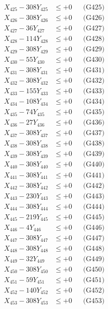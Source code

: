 \documentclass[a4paper,10pt]{article}
\begin{document}
{\begin{align}
X_{425} - 308Y_{425} &\leq +0 && \text{(G425)} \\
X_{426} - 308Y_{426} &\leq +0 && \text{(G426)} \\
X_{427} - 36Y_{427} &\leq +0 && \text{(G427)} \\
X_{428} - 114Y_{428} &\leq +0 && \text{(G428)} \\
X_{429} - 308Y_{429} &\leq +0 && \text{(G429)} \\
X_{430} - 55Y_{430} &\leq +0 && \text{(G430)} \\
\allowbreak
X_{431} - 308Y_{431} &\leq +0 && \text{(G431)} \\
X_{432} - 308Y_{432} &\leq +0 && \text{(G432)} \\
X_{433} - 155Y_{433} &\leq +0 && \text{(G433)} \\
X_{434} - 108Y_{434} &\leq +0 && \text{(G434)} \\
X_{435} - 74Y_{435} &\leq +0 && \text{(G435)} \\
X_{436} - 27Y_{436} &\leq +0 && \text{(G436)} \\
X_{437} - 308Y_{437} &\leq +0 && \text{(G437)} \\
X_{438} - 308Y_{438} &\leq +0 && \text{(G438)} \\
X_{439} - 308Y_{439} &\leq +0 && \text{(G439)} \\
X_{440} - 308Y_{440} &\leq +0 && \text{(G440)} \\
\allowbreak
X_{441} - 308Y_{441} &\leq +0 && \text{(G441)} \\
X_{442} - 308Y_{442} &\leq +0 && \text{(G442)} \\
X_{443} - 230Y_{443} &\leq +0 && \text{(G443)} \\
X_{444} - 308Y_{444} &\leq +0 && \text{(G444)} \\
X_{445} - 219Y_{445} &\leq +0 && \text{(G445)} \\
X_{446} - 4Y_{446} &\leq +0 && \text{(G446)} \\
X_{447} - 308Y_{447} &\leq +0 && \text{(G447)} \\
X_{448} - 308Y_{448} &\leq +0 && \text{(G448)} \\
X_{449} - 32Y_{449} &\leq +0 && \text{(G449)} \\
X_{450} - 308Y_{450} &\leq +0 && \text{(G450)} \\
\allowbreak
X_{451} - 59Y_{451} &\leq +0 && \text{(G451)} \\
X_{452} - 140Y_{452} &\leq +0 && \text{(G452)} \\
X_{453} - 308Y_{453} &\leq +0 && \text{(G453)} \\

\end{align}}
\end{document}

